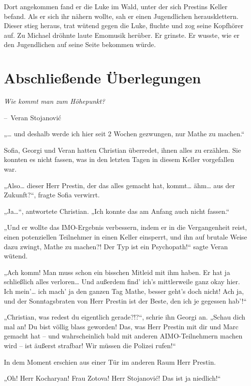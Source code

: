 \documentclass[oneside]{memoir}
\makeatletter
\newenvironment{chapquote}[2][2em]
  {\setlength{\@tempdima}{#1}%
   \def\chapquote@author{#2}%
   \parshape 1 \@tempdima \dimexpr\textwidth-2\@tempdima\relax%
   \itshape}
  {\par\normalfont\hfill--\ \chapquote@author\hspace*{\@tempdima}\par\bigskip}
\makeatother
\begin{document}
Dort angekommen fand er die Luke im Wald, unter der sich Prestins Keller befand. Als er sich ihr nähern wollte, sah er einen Jugendlichen herausklettern. Dieser stieg heraus, trat wütend gegen die Luke, fluchte und zog seine Kopfhörer auf. Zu Michael dröhnte laute Emomusik herüber. Er grinste. Er wusste, wie er den Jugendlichen auf seine Seite bekommen würde.

\chapter{Abschließende Überlegungen} %
\begin{chapquote}{Veran Stojanović}
\glqq Wie kommt man zum Höhepunkt?\grqq
\end{chapquote}

„\ldots{} und deshalb werde ich hier seit 2 Wochen gezwungen, nur Mathe zu machen.“

Sofia, Georgi und Veran hatten Christian überredet, ihnen alles zu erzählen. Sie konnten es nicht fassen, was in den letzten Tagen in diesem Keller vorgefallen war.

„Also\ldots{} dieser Herr Prestin, der das alles gemacht hat, kommt\ldots{} ähm\ldots{} aus der Zukunft?“, fragte Sofia verwirrt.

„Ja\ldots“, antwortete Christian. „Ich konnte das am Anfang auch nicht fassen.“

„Und er wollte das IMO-Ergebnis verbessern, indem er in die Vergangenheit reist, einen potenziellen Teilnehmer in einen Keller einsperrt, und ihn auf brutale Weise dazu zwingt, Mathe zu machen?! Der Typ ist ein Psychopath!“ sagte Veran wütend.

„Ach komm! Man muss schon ein bisschen Mitleid mit ihm haben. Er hat ja schließlich alles verloren\ldots{} Und außerdem find' ich's mittlerweile ganz okay hier. Ich mein'\ldots{} ich mach' ja den ganzen Tag Mathe, besser geht’s doch nicht!
Ach ja, und der Sonntagsbraten von Herr Prestin ist der Beste, den ich je gegessen hab'!“

„Christian, was redest du eigentlich gerade?!?“, schrie ihn Georgi an. „Schau dich mal an! Du bist völlig blass geworden! Das, was Herr Prestin mit dir und Marc gemacht hat -- und wahrscheinlich bald mit anderen AIMO-Teilnehmern machen wird -- ist äußerst strafbar! Wir müssen die Polizei rufen!“

In dem Moment erschien aus einer Tür im anderen Raum Herr Prestin.

„Oh! Herr Kocharyan! Frau Zotova! Herr Stojanović! Das ist ja niedlich!“
\end{document}
